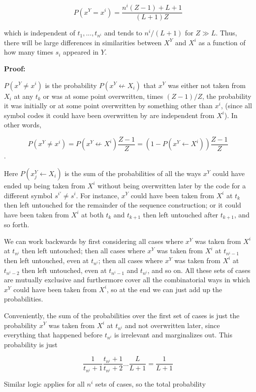 \documentclass{article}
\begin{document}
$$P(x^Y = x^i) = \frac{n^i(Z-1) + L + 1}{(L+1)Z}$$

which is independent of $t_1, ..., t_{n^i}$ and tends to $n^i/(L+1)$ for $Z \gg L.$ Thus, there will be large differences in similarities between $X^Y$ and $X^i$ as a function of how many times $s_i$ appeared in $Y$.

\textbf{Proof:}

$P(x^Y \neq x^i)$ is the probability $P(x^Y \not\leftarrow X_i)$ that $x^Y$ was either not taken from $X_i$ at any $t_k$ or was at some point overwritten, times $(Z-1)/Z$, the probability it was initially or at some point overwritten by something other than $x^i$, (since all symbol codes it could have been overwritten by are independent from $X^i$). In other words, 

$$P(x^Y \neq x^i) = P(x^Y \not\leftarrow X^i)\frac{Z-1}{Z} = \left(1 - P(x^Y \leftarrow X^i)\right)\frac{Z-1}{Z} $$.

Here $P(x^Y_j \leftarrow X_i)$ is the sum of the probabilities of all the ways $x^Y$ could have ended up being taken from $X^i$ without being overwritten later by the code for a different symbol $s^{i'} \neq s^i$. For instance, $x^Y$ could have been taken from $X^i$ at $t_k$ then left untouched for the remainder of the sequence construction; or it could have been taken from $X^i$ at both $t_k$ and $t_{k+1}$ then left untouched after $t_{k+1}$, and so forth.

We can work backwards by first considering all cases where $x^Y$ was taken from $X^i$ at $t_{n^i}$ then left untouched; then all cases where $x^Y$ was taken from $X^i$ at $t_{n^i-1}$ then left untouched, even at $t_{n^i}$; then all cases where $x^Y$ was taken from $X^i$ at $t_{n^i-2}$ then left untouched, even at $t_{n^i-1}$ and $t_{n^i}$, and so on. All these sets of cases are mutually exclusive and furthermore cover all the combinatorial ways in which $x^Y$ could have been taken from $X^i$, so at the end we can just add up the probabilities.

Conveniently, the sum of the probabilities over the first set of cases is just the probability $x^Y$ was taken from $X^i$ at $t_{n^i}$ and not overwritten later, since everything that happened before $t_{n^i}$ is irrelevant and marginalizes out. This probability is just 

$$\frac{1}{t_{n^i}+1}\frac{t_{n^i}+1}{t_{n^i}+2}...\frac{L}{L+1} = \frac{1}{L+1}$$

Similar logic applies for all $n^i$ sets of cases, so the total probability
\end{document}

